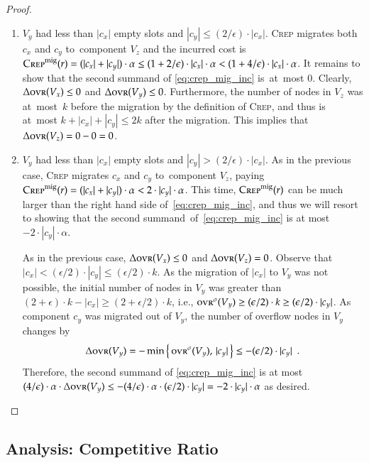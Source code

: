 \documentclass[11pt,a4paper]{scrartcl}
\newcommand{\CREP}{\textsc{Crep}\xspace}
\newcommand{\CREPmig}{\CREP^\textnormal{mig}}
\newcommand{\ovr}{\textsc{ovr}}
\newcommand{\eps}{\ensuremath{\epsilon}}
\begin{document}
\begin{proof}
\begin{enumerate}
\item 
$V_y$ had less than $|c_x|$ empty slots and $|c_y| \leq (2/\eps) \cdot |c_x|$.
\CREP migrates both $c_x$ and $c_y$ to~component $V_z$ and the incurred cost is 
$\CREPmig(r) = (|c_x| + |c_y|) \cdot \alpha \leq (1+2/\eps) \cdot |c_x| \cdot \alpha
< (1 + 4/\eps) \cdot |c_x| \cdot \alpha$. 
It remains to show that the second summand of \eqref{eq:crep_mig_inc} is~at~most $0$. 
Clearly, $\Delta \ovr(V_x) \leq 0$ and $\Delta \ovr(V_y) \leq 0$. 
Furthermore, the number of 
nodes in $V_z$ was at~most~$k$ before the migration by the definition of \CREP,
and thus is at~most $k + |c_x| + |c_y| \leq 2k$ after the migration.
This implies that $\Delta \ovr(V_z) = 0 - 0 = 0$.

\item 
$V_y$ had less than $|c_x|$ empty slots and $|c_y| > (2/\eps) \cdot |c_x|$.
As in the previous case, \CREP migrates $c_x$ and $c_y$ to~component $V_z$, 
paying $\CREPmig(r) = (|c_x| + |c_y|) \cdot \alpha < 2 \cdot |c_y| \cdot \alpha$.
This time, $\CREPmig(r)$ can be much larger than the right hand side 
of~\eqref{eq:crep_mig_inc}, and thus we will resort to showing that the second summand~of~\eqref{eq:crep_mig_inc} is at most $ - 2 \cdot |c_y| \cdot \alpha$.

As in the previous case, $\Delta \ovr(V_x) \leq 0$ and $\Delta \ovr(V_z) = 0$. 
Observe that $|c_x| < (\eps / 2) \cdot |c_y| \leq (\eps / 2) \cdot k$.
As the migration of $|c_x|$ to $V_y$ was not possible, the initial number
of nodes in $V_y$ was greater than $(2 + \eps) \cdot k - |c_x| \geq (2+\eps/2) \cdot k$,
i.e., $\ovr^\sigma(V_y) \geq (\eps/2) \cdot k \geq (\eps/2) \cdot |c_y|$. 
As component $c_y$ was migrated out of $V_y$, the number of overflow nodes in $V_y$ changes by
\[
	\Delta \ovr(V_y) 
		= - \min \left\{ \,\ovr^\sigma(V_y), \,|c_y| \,\right\}
		\leq - (\eps/2) \cdot |c_y|
	\enspace.
\]
Therefore, the second summand of \eqref{eq:crep_mig_inc} is at most 
$(4/\eps) \cdot \alpha \cdot \Delta\ovr(V_y) \leq - (4/\eps) \cdot \alpha \cdot (\eps/2) \cdot |c_y|
= - 2 \cdot |c_y| \cdot \alpha$ as desired.
\end{enumerate}
\end{proof}


\subsection{Analysis: Competitive Ratio}
\end{document}
